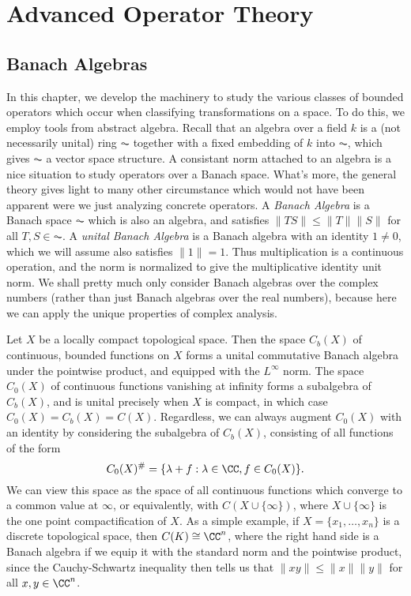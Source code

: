 \part{Advanced Operator Theory}





\chapter{Banach Algebras}

In this chapter, we develop the machinery to study the various classes of bounded operators which occur when classifying transformations on a space. To do this, we employ tools from abstract algebra. Recall that an algebra over a field $k$ is a (not necessarily unital) ring $\AC$ together with a fixed embedding of $k$ into $\AC$, which gives $\AC$ a vector space structure. A consistant norm attached to an algebra is a nice situation to study operators over a Banach space. What's more, the general theory gives light to many other circumstance  which would not have been apparent were we just analyzing concrete operators. A \emph{Banach Algebra} is a Banach space $\AC$ which is also an algebra, and satisfies $\| TS \| \leq \| T \| \| S \|$ for all $T,S \in \AC$. A \emph{unital Banach Algebra} is a Banach algebra with an identity $1 \neq 0$, which we will assume also satisfies $\| 1 \| = 1$. Thus multiplication is a continuous operation, and the norm is normalized to give the multiplicative identity unit norm. We shall pretty much only consider Banach algebras over the complex numbers (rather than just Banach algebras over the real numbers), because here we can apply the unique properties of complex analysis.

\begin{example}
    Let $X$ be a locally compact topological space. Then the space $C_b(X)$ of continuous, bounded functions on $X$ forms a unital commutative Banach algebra under the pointwise product, and equipped with the $L^\infty$ norm. The space $C_0(X)$ of continuous functions vanishing at infinity forms a subalgebra of $C_b(X)$, and is unital precisely when $X$ is compact, in which case $C_0(X) = C_b(X) = C(X)$. Regardless, we can always augment $C_0(X)$ with an identity by considering the subalgebra of $C_b(X)$, consisting of all functions of the form
    \[ C_0(X)^\# = \{ \lambda + f : \lambda \in \CC, f \in C_0(X) \}. \]
    We can view this space as the space of all continuous functions which converge to a common value at $\infty$, or equivalently, with $C(X \cup \{ \infty \})$, where $X \cup \{ \infty \}$ is the one point compactification of $X$. As a simple example, if $X = \{ x_1, \dots, x_n \}$ is a discrete topological space, then $C(K) \cong \CC^n$, where the right hand side is a Banach algebra if we equip it with the standard norm and the pointwise product, since the Cauchy-Schwartz inequality then tells us that $\| xy \| \leq \| x \| \| y \|$ for all $x,y \in \CC^n$.
\end{example}

